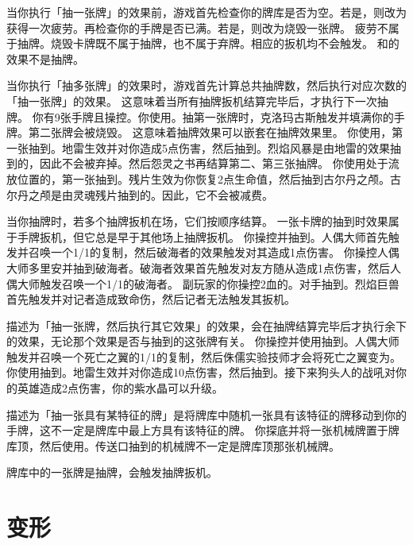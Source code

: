 当你执行「抽一张牌」的效果前，游戏首先检查你的牌库是否为空。若是，则改为获得一次疲劳。再检查你的手牌是否已满。若是，则改为烧毁一张牌。
\notice 疲劳不属于抽牌。烧毁卡牌既不属于抽牌，也不属于弃牌。相应的扳机均不会触发。
\notice {}和的效果不是抽牌。

当你执行「抽多张牌」的效果时，游戏首先计算总共抽牌数，然后执行对应次数的「抽一张牌」的效果。
\notice 这意味着当所有抽牌扳机结算完毕后，才执行下一次抽牌。
\example 你有9张手牌且操控。你使用。抽第一张牌时，克洛玛古斯触发并填满你的手牌。第二张牌会被烧毁。
\notice 这意味着抽牌效果可以嵌套在抽牌效果里。
\example 你使用，第一张抽到。地雷生效并对你造成5点伤害，然后抽到。烈焰风暴是由地雷的效果抽到的，因此不会被弃掉。然后怨灵之书再结算第二、第三张抽牌。
\example 你使用处于流放位置的，第一张抽到。残片生效为你恢复2点生命值，然后抽到古尔丹之颅。古尔丹之颅是由灵魂残片抽到的。因此，它不会被减费。

当你抽牌时，若多个抽牌扳机在场，它们按顺序结算。
\notice 一张卡牌的抽到时效果属于手牌扳机，但它总是早于其他场上抽牌扳机。
\example {} 你操控并抽到。人偶大师首先触发并召唤一个1/1的复制，然后破海者的效果触发对其造成1点伤害。
\example {} 你操控人偶大师多里安并抽到破海者。破海者效果首先触发对友方随从造成1点伤害，然后人偶大师触发召唤一个1/1的破海者。
\example {}副玩家的你操控2血的。对手抽到。烈焰巨兽首先触发并对记者造成致命伤，然后记者无法触发其扳机。

描述为「抽一张牌，然后执行其它效果」的效果，会在抽牌结算完毕后才执行余下的效果，无论那个效果是否与抽到的这张牌有关。
\example 你操控并使用抽到。人偶大师触发并召唤一个死亡之翼的1/1的复制，然后侏儒实验技师才会将死亡之翼变为。
\example 你使用抽到。地雷生效并对你造成10点伤害，然后抽到。接下来狗头人的战吼对你的英雄造成2点伤害，你的紫水晶可以升级。

描述为「抽一张具有某特征的牌」是将牌库中随机一张具有该特征的牌移动到你的手牌，这不一定是牌库中最上方具有该特征的牌。
\example 你探底并将一张机械牌置于牌库顶，然后使用。传送口抽到的机械牌不一定是牌库顶那张机械牌。

牌库中的一张牌是抽牌，会触发抽牌扳机。

\section{变形}


